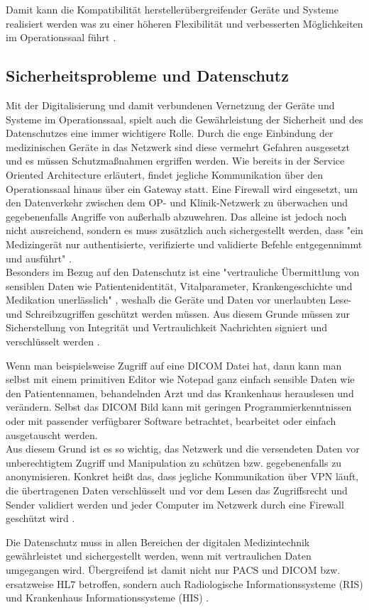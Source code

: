 Damit kann die Kompatibilität herstellerübergreifender Geräte und Systeme realisiert werden was zu einer höheren Flexibilität und verbesserten Möglichkeiten im Operationssaal führt \cite{DerDigitaleOperationssaal}.

\subsection{Sicherheitsprobleme und Datenschutz}

Mit der Digitalisierung und damit verbundenen Vernetzung der Geräte und Systeme im Operationssaal, spielt auch die Gewährleistung der Sicherheit und des Datenschutzes eine immer wichtigere Rolle.
Durch die enge Einbindung der medizinischen Geräte in das Netzwerk sind diese vermehrt Gefahren ausgesetzt und es müssen Schutzmaßnahmen ergriffen werden. Wie bereits in der Service Oriented Architecture erläutert, findet jegliche Kommunikation über den Operationssaal hinaus über ein Gateway statt. Eine Firewall wird eingesetzt, um den Datenverkehr zwischen dem OP- und Klinik-Netzwerk zu überwachen und gegebenenfalls Angriffe von außerhalb abzuwehren. Das alleine ist jedoch noch nicht ausreichend, sondern es muss zusätzlich auch sichergestellt werden, dass "ein Medizingerät nur authentisierte, verifizierte und validierte Befehle entgegennimmt und ausführt" \cite{DerDigitaleOperationssaal}. \\
Besonders im Bezug auf den Datenschutz ist eine "vertrauliche Übermittlung von sensiblen Daten wie Patientenidentität, Vitalparameter, Krankengeschichte und Medikation unerlässlich" \cite{DerDigitaleOperationssaal}, weshalb die Geräte und Daten vor unerlaubten Lese- und Schreibzugriffen geschützt werden müssen. Aus diesem Grunde müssen zur Sicherstellung von Integrität und Vertraulichkeit Nachrichten signiert und verschlüsselt werden \cite{DerDigitaleOperationssaal}. 

Wenn man beispielsweise Zugriff auf eine DICOM Datei hat, dann kann man selbst mit einem primitiven Editor wie Notepad ganz einfach sensible Daten wie den Patientennamen, behandelnden Arzt und das Krankenhaus herauslesen und verändern. Selbst das DICOM Bild kann mit geringen Programmierkenntnissen oder mit passender verfügbarer Software betrachtet, bearbeitet oder einfach ausgetauscht werden.\\
Aus diesem Grund ist es so wichtig, das Netzwerk und die versendeten Daten vor unberechtigtem Zugriff und Manipulation zu schützen bzw. gegebenenfalls zu anonymisieren. Konkret heißt das, dass jegliche Kommunikation über VPN läuft, die übertragenen Daten verschlüsselt und vor dem Lesen das Zugriffsrecht und Sender validiert werden und jeder Computer im Netzwerk durch eine Firewall geschützt wird \cite{DICOM}. 

Die Datenschutz muss in allen Bereichen der digitalen Medizintechnik gewährleistet und sichergestellt werden, wenn mit vertraulichen Daten umgegangen wird. Übergreifend ist damit nicht nur PACS und DICOM bzw. ersatzweise HL7 betroffen, sondern auch Radiologische Informationssysteme (RIS) und Krankenhaus Informationssysteme (HIS) \cite{DICOM}. 
